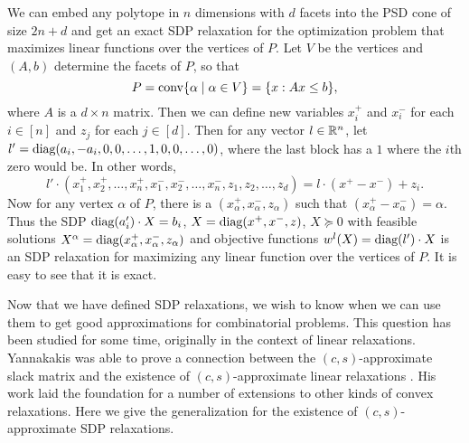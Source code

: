 \begin{example}
We can embed any polytope in $n$ dimensions with $d$ facets into the PSD cone of size $2n+d$ and get an exact SDP relaxation for the optimization problem that maximizes linear functions over the vertices of $P$. Let $V$ be the vertices and $(A,b)$ determine the facets of $P$, so that
\[P = \operatorname{conv}\{\alpha \mid \alpha \in V\} = \{x: Ax \leq b\},\]
where $A$ is a $d \times n$ matrix. Then we can define new variables $x_i^+$ and $x_i^-$ for each $i \in [n]$ and $z_j$ for each $j \in [d]$. Then for any vector $l \in \mathbb R^n$, let $l' = \text{diag}(a_i,-a_i,0,0,\dots,1,0,0,\dots,0)$, where the last block has a $1$ where the $i$th zero would be. In other words,
\[l' \cdot (x_1^+,x_2^+,\dots,x_n^+,x_1^-,x_2^-,\dots,x_n^-,z_1,z_2,\dots,z_d) = l \cdot (x^+ - x^-) + z_i.\]
Now for any vertex $\alpha$ of $P$, there is a $(x_\alpha^+,x_\alpha^-,z_\alpha)$ such that $(x_\alpha^+ - x_\alpha^-) = \alpha$. Thus the SDP $\text{diag}(a_i') \cdot X = b_i$, $X = \text{diag}(x^+,x^-,z)$, $X \succeq 0$ with feasible solutions $X^\alpha = \text{diag}(x_\alpha^+,x_\alpha^-,z_\alpha)$ and objective functions $w^l(X) = \text{diag}(l') \cdot X$ is an SDP relaxation for maximizing any linear function over the vertices of $P$. It is easy to see that it is exact.

\end{example}

Now that we have defined SDP relaxations, we wish to know when we can use them to get good approximations for combinatorial problems. This question has been studied for some time, originally in the context of linear relaxations. Yannakakis was able to prove a connection between the $(c,s)$-approximate slack matrix and the existence of $(c,s)$-approximate linear relaxations \cite{Yann88}. His work laid the foundation for a number of extensions to other kinds of convex relaxations. Here we give the generalization for the existence of $(c,s)$-approximate SDP relaxations.

